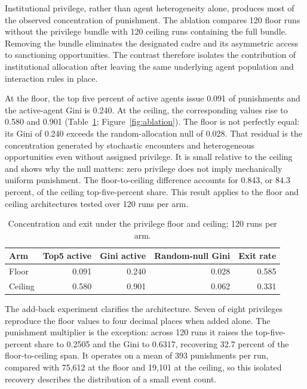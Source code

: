 \documentclass[12pt]{article}
\begin{document}
Institutional privilege, rather than agent heterogeneity alone, produces most of the observed
concentration of punishment. The ablation compares 120 floor runs without the privilege bundle
with 120 ceiling runs containing the full bundle. Removing the bundle eliminates the designated
cadre and its asymmetric access to sanctioning opportunities. The contrast therefore isolates
the contribution of institutional allocation after leaving the same underlying agent population
and interaction rules in place.

At the floor, the top five percent of active agents issue 0.091 of punishments and the
active-agent Gini is 0.240. At the ceiling, the corresponding values rise to 0.580 and 0.901
(Table~\ref{tab:privilege-ablation}; Figure~\ref{fig:ablation}). The floor is not perfectly
equal: its Gini of 0.240 exceeds the random-allocation null of 0.028. That residual is the
concentration generated by stochastic encounters and heterogeneous opportunities even without
assigned privilege. It is small relative to the ceiling and shows why the null matters: zero
privilege does not imply mechanically uniform punishment. The floor-to-ceiling difference
accounts for 0.843, or 84.3 percent, of the ceiling top-five-percent share. This result applies
to the floor and ceiling architectures tested over 120 runs per arm.

\begin{table}[htbp]
\centering
\caption{Concentration and exit under the privilege floor and ceiling; 120 runs per arm.}
\label{tab:privilege-ablation}
\begin{tabular}{lrrrr}
\hline
Arm & Top5 active & Gini active & Random-null Gini & Exit rate \\
\hline
Floor & 0.091 & 0.240 & 0.028 & 0.585 \\
Ceiling & 0.580 & 0.901 & 0.062 & 0.331 \\
\hline
\end{tabular}
\end{table}

The add-back experiment clarifies the architecture. Seven of eight privileges reproduce the
floor values to four decimal places when added alone. The punishment multiplier is the
exception: across 120 runs it raises the top-five-percent share to 0.2505 and the Gini to
0.6317, recovering 32.7 percent of the floor-to-ceiling span. It operates on a mean of 393
punishments per run, compared with 75,612 at the floor and 19,101 at the ceiling, so this
isolated recovery describes the distribution of a small event count.
\end{document}
